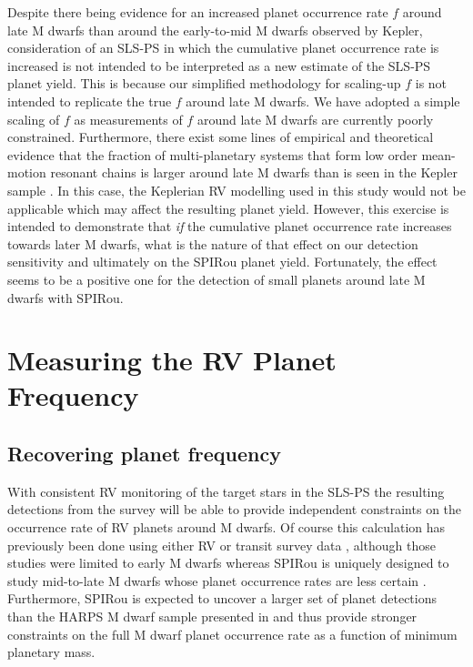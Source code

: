 Despite there being evidence for an increased planet occurrence rate $f$ around late M dwarfs
than around the early-to-mid M dwarfs observed by Kepler, consideration of an SLS-PS
in which the cumulative planet occurrence rate is increased is not intended to be
interpreted as a new estimate of the SLS-PS planet yield. This is because our simplified
methodology for scaling-up $f$ is not intended to replicate the true $f$ around late M
dwarfs. We have adopted a simple scaling of $f$ as measurements
of $f$ around late M dwarfs are currently poorly constrained. Furthermore, there exist
some lines of empirical and theoretical evidence \citep{gillon17, pan17}
that the fraction of multi-planetary systems that
form low order mean-motion resonant chains is larger around late M dwarfs than is seen in the
Kepler sample \citep{lissauer11, fabrycky14}. In this case, the Keplerian RV modelling used
in this study would not be applicable which may affect the resulting planet yield.
However, this exercise is intended to demonstrate that \emph{if} the cumulative planet occurrence
rate increases towards later M dwarfs, what is the nature of that effect
on our detection sensitivity and ultimately on the SPIRou planet yield.
Fortunately, the effect seems to be a positive
one for the detection of small planets around late M dwarfs with SPIRou.

\section{Measuring the RV Planet Frequency} \label{BSsect:measurements}
\subsection{Recovering planet frequency} \label{BSsect:occurrence}
With consistent RV monitoring of the target stars in the SLS-PS the resulting detections
from the survey will be able to provide independent constraints on the occurrence rate of
RV planets around M dwarfs.
Of course this calculation has previously been done using either
RV or transit survey data \citep[e.g.][]{bonfils13, dressing15a},
although those studies were limited to early M dwarfs whereas SPIRou is uniquely designed
to study mid-to-late M dwarfs whose planet occurrence rates are less certain \citep{demory16}.
Furthermore,
SPIRou is expected to uncover a larger set of planet detections than the HARPS M dwarf sample
presented in \cite{bonfils13} and thus provide stronger constraints on the full M dwarf planet
occurrence rate as a function of minimum planetary mass. \\

